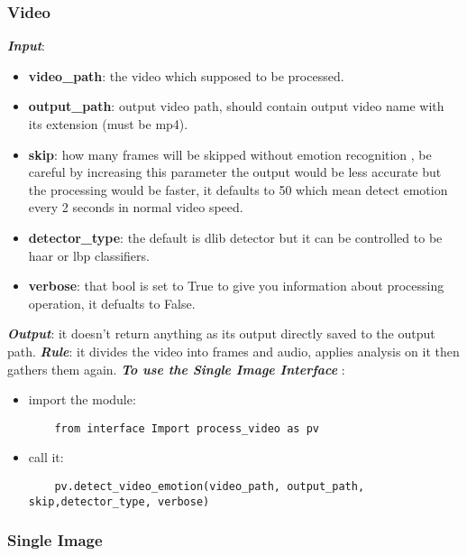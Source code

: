 \subsubsection{Video}
\textbf{\textit{Input}}: 
\begin{itemize}
	\item  \textbf{video\_path}: the video which supposed to be processed.
	\item  \textbf{output\_path}: output video path, should contain output video name with its extension (must be mp4).
	\item  \textbf{skip}: how many frames will be skipped without emotion recognition , be careful by increasing this parameter the output would be less accurate but the processing would be faster, it defaults to 50 which mean detect emotion every 2 seconds in normal video speed.
	\item \textbf{detector\_type}: the default is dlib detector but it can be controlled to be haar or lbp classifiers.
	\item  \textbf{verbose}: that bool is set to True to give you information about processing operation, it defualts to False.
\end{itemize}
\textbf{\textit{Output}}: it doesn't return anything as its output directly saved to the output path.
\newline\textbf{\textit{ Rule}}: it divides the video into frames and audio, applies analysis on it then gathers them again.
\newline 
\noindent \textbf{\textit{To use the Single Image Interface }}:
\begin{itemize}
	\item import the module:
	\begin{verbatim}
	from interface Import process_video as pv
	\end{verbatim}
	\item call it:
	\begin{verbatim}
	pv.detect_video_emotion(video_path, output_path, skip,detector_type, verbose)
	\end{verbatim}
\end{itemize}


\subsubsection{Single Image}

